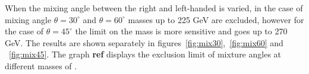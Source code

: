 % 




When the mixing angle between the right and left-handed \wprime is varied, in the case of mixing angle $\theta=30^\circ$ and $\theta=60^\circ$ masses up to 225 GeV are excluded, however for the case of $\theta=45^\circ$ the limit on the mass is more sensitive and goes up to 270 GeV. The results are shown separately in figures~\ref{fig:mix30},~\ref{fig:mix60} and ~\ref{fig:mix45}. The graph {\bf ref} displays the exclusion limit of mixture angles at different masses of \wprime.

 


 
